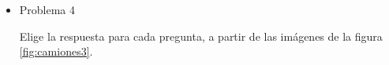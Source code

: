 \documentclass[11pt]{book}
\begin{document}
\begin{itemize}
\begin{boxK}
\begin{enumerate}

              \end{enumerate}

          \end{boxK}
          \newpage
    \item Problema 4
          \begin{boxK}
              Elige la respuesta para cada pregunta, a partir de las imágenes de la figura
              \ref{fig:camiones3}.\\


\end{boxK}
\end{itemize}
\end{document}
